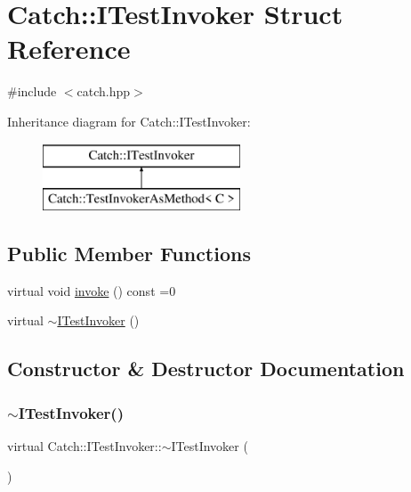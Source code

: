 \hypertarget{structCatch_1_1ITestInvoker}{}\section{Catch\+:\+:I\+Test\+Invoker Struct Reference}
\label{structCatch_1_1ITestInvoker}


{\ttfamily \#include $<$catch.\+hpp$>$}

Inheritance diagram for Catch\+:\+:I\+Test\+Invoker\+:\begin{figure}[H]
\begin{center}
\leavevmode
\includegraphics[height=2.000000cm]{structCatch_1_1ITestInvoker}
\end{center}
\end{figure}
\subsection*{Public Member Functions}
\begin{DoxyCompactItemize}
\item 
virtual void \mbox{\hyperlink{structCatch_1_1ITestInvoker_a6fcd5c5b67d6d5ade6491ff33411ca7f}{invoke}} () const =0
\item 
virtual \mbox{\hyperlink{structCatch_1_1ITestInvoker_a2c89f3eece5b1b677243766e409bd831}{$\sim$\+I\+Test\+Invoker}} ()
\end{DoxyCompactItemize}


\subsection{Constructor \& Destructor Documentation}
\mbox{\label{structCatch_1_1ITestInvoker_a2c89f3eece5b1b677243766e409bd831}} 
\subsubsection{\texorpdfstring{$\sim$\+I\+Test\+Invoker()}{~ITestInvoker()}}
{\footnotesize\ttfamily virtual Catch\+::\+I\+Test\+Invoker\+::$\sim$\+I\+Test\+Invoker (\begin{DoxyParamCaption}{ }\end{DoxyParamCaption})\hspace{0.3cm}{\ttfamily [virtual]}}



